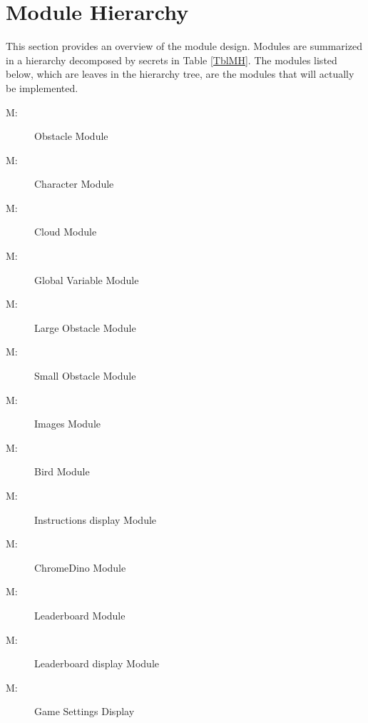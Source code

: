 \documentclass[12pt, titlepage]{article}
\newcounter{mnum}
\newcommand{\mthemnum}{M\themnum}
\begin{document}
\section{Module Hierarchy} \label{SecMH}

This section provides an overview of the module design. Modules are summarized
in a hierarchy decomposed by secrets in Table \ref{TblMH}. The modules listed
below, which are leaves in the hierarchy tree, are the modules that will
actually be implemented.

\begin{description}
\item [ \mthemnum \label{mHH}:] Obstacle Module
\item [ \mthemnum \label{mHH}:] Character Module
\item [ \mthemnum \label{mHH}:] Cloud Module
\item [ \mthemnum \label{mHH}:] Global Variable Module
\item [ \mthemnum \label{mHH}:] Large Obstacle Module
\item [ \mthemnum \label{mHH}:] Small Obstacle Module
\item [ \mthemnum \label{mHH}:] Images Module
\item [ \mthemnum \label{mHH}:] Bird Module
\item [ \mthemnum \label{mHH}:] Instructions display Module
\item [ \mthemnum \label{mHH}:] ChromeDino Module
\item [ \mthemnum \label{mHH}:] Leaderboard Module
\item [ \mthemnum \label{mHH}:] Leaderboard display Module
\item [ \mthemnum \label{mHH}:] Game Settings Display

\end{description}


\end{document}
